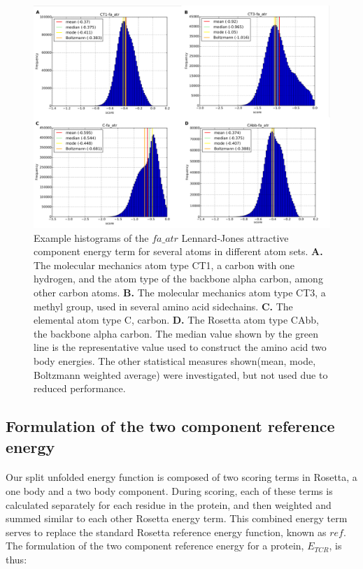 \begin{figure}
  \includegraphics[width=\linewidth]{Figures/atom_energy_distribution_examples.pdf}
  \caption{Example histograms of the $fa\_atr$ Lennard-Jones attractive component energy term for several atoms in different atom sets.
    \textbf{A.} The molecular mechanics atom type CT1, a carbon with one hydrogen, and the atom type of the backbone alpha carbon, among other carbon atoms.
    \textbf{B.} The molecular mechanics atom type CT3, a methyl group, used in several amino acid sidechains.
    \textbf{C.} The elemental atom type C, carbon.
    \textbf{D.} The Rosetta atom type CAbb, the backbone alpha carbon.
    The median value shown by the green line is the representative value used to construct the amino acid two body energies.
    The other statistical measures shown(mean, mode, Boltzmann weighted average) were investigated, but not used due to reduced performance.}
  \label{fig:tbaedist}
\end{figure}


\subsection{Formulation of the two component reference energy}
\paragraph{}
Our split unfolded energy function is composed of two scoring terms in Rosetta, a one body and a two body component.
During scoring, each of these terms is calculated separately for each residue in the protein, and then weighted and summed similar to each other Rosetta energy term.
This combined energy term serves to replace the standard Rosetta reference energy function, known as $ref$.
The formulation of the two component reference energy for a protein, $E_{TCR}$, is thus:

